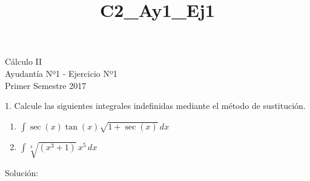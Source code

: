 \documentclass[a4paper,10pt]{article}
\title{C2_Ay1_Ej1}
\newcommand{\dis}{\displaystyle}
\begin{document}
\begin{center}
Cálculo II\\
Ayudantía Nº1 - Ejercicio Nº1\\
Primer Semestre 2017
\end{center}





1. Calcule las siguientes integrales indefinidas mediante el m\'{e}todo de
sustituci\'{o}n.
\begin{enumerate}[label=\emph{\alph*)}]
\item $\dis \int \sec(x) \tan(x)\sqrt{1+\sec(x)}\, dx$
\item $\dis \int \sqrt[3]{(x^3+1)}\, x^5\, dx$
\end{enumerate}


\vspace{5mm}

Solución:
\end{document}
